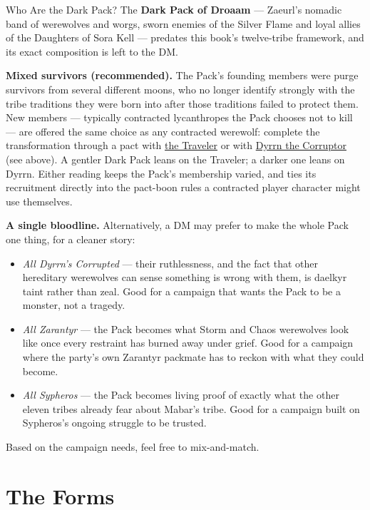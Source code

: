 \documentclass[twocolumn]{dndbook}
\begin{document}
\begin{DndSidebar}[float=!b]{Who Are the Dark Pack?}
The \textbf{Dark Pack of Droaam} --- Zaeurl's nomadic band of werewolves and worgs, sworn enemies of the Silver Flame and loyal allies of the Daughters of Sora Kell --- predates this book's twelve-tribe framework, and its exact composition is left to the DM.

\textbf{Mixed survivors (recommended).} The Pack's founding members were purge survivors from several different moons, who no longer identify strongly with the tribe traditions they were born into after those traditions failed to protect them.
New members --- typically contracted lycanthropes the Pack chooses not to kill --- are offered the same choice as any contracted werewolf: complete the transformation through a pact with \hyperref[par:the-traveler]{the Traveler} or with \hyperref[par:dyrrn-corruptor]{Dyrrn the Corruptor} (see above).
A gentler Dark Pack leans on the Traveler; a darker one leans on Dyrrn.
Either reading keeps the Pack's membership varied, and ties its recruitment directly into the pact-boon rules a contracted player character might use themselves.

\textbf{A single bloodline.} Alternatively, a DM may prefer to make the whole Pack one thing, for a cleaner story:
\begin{itemize}
    \item \emph{All Dyrrn's Corrupted} --- their ruthlessness, and the fact that other hereditary werewolves can sense something is wrong with them, is daelkyr taint rather than zeal. Good for a campaign that wants the Pack to be a monster, not a tragedy.
    \item \emph{All Zarantyr} --- the Pack becomes what Storm and Chaos werewolves look like once every restraint has burned away under grief. Good for a campaign where the party's own Zarantyr packmate has to reckon with what they could become.
    \item \emph{All Sypheros} --- the Pack becomes living proof of exactly what the other eleven tribes already fear about Mabar's tribe. Good for a campaign built on Sypheros's ongoing struggle to be trusted.
\end{itemize}

Based on the campaign needs, feel free to mix-and-match.
\end{DndSidebar}\par

\section*{The Forms}\label{sec:the-forms}
\end{document}
